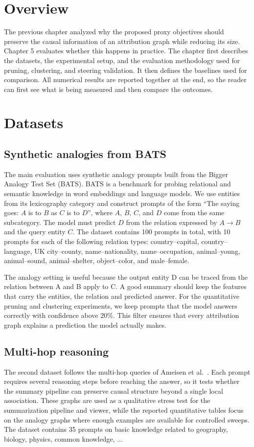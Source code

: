 \documentclass[../main.tex]{subfiles}
\begin{document}
\section{Overview}

The previous chapter analyzed why the proposed proxy objectives should preserve the causal
information of an attribution graph while reducing its size. Chapter 5 evaluates
whether this happens in practice. The chapter first describes the datasets, the
experimental setup, and the evaluation methodology used for pruning, clustering,
and steering validation. It then defines the baselines used for comparison. All
numerical results are reported together at the end, so the reader can first see
what is being measured and then compare the outcomes.

\section{Datasets}
\label{sec:datasets}

\subsection{Synthetic analogies from BATS}
The main evaluation uses synthetic analogy prompts built from the Bigger Analogy
Test Set (BATS). BATS is a benchmark for probing relational and semantic
knowledge in word embeddings and language models. We use entities from its
lexicography category and construct prompts of the form ``The saying goes: $A$
is to $B$ as $C$ is to $D$'', where $A$, $B$, $C$, and $D$ come from the same
subcategory. The model must predict $D$ from the relation expressed by
$A \to B$ and the query entity $C$. The dataset contains 100 prompts in total,
with 10 prompts for each of the following relation types: country--capital,
country--language, UK city--county, name--nationality, name--occupation,
animal--young, animal--sound, animal--shelter, object--color, and male--female.

The analogy setting is useful because the output entity D can be traced from the relation
between A and B apply to C. A good summary should keep the
features that carry the entities, the relation and predicted answer.
For the quantitative pruning and clustering experiments, we keep prompts that
the model answers correctly with confidence above $20\%$. This filter ensures
that every attribution graph explains a prediction the model actually makes.

\subsection{Multi-hop reasoning}
The second dataset follows the multi-hop queries of Ameisen et
al.~\cite{ameisen2025circuit}. Each prompt requires several reasoning steps
before reaching the answer, so it tests whether the summary pipeline can preserve
causal structure beyond a single local association. These graphs are used as a
qualitative stress test for the summarization pipeline and viewer, while the
reported quantitative tables focus on the analogy graphs where enough examples
are available for controlled sweeps. The dataset contains 35 prompts on basic knowledge
related to geography, biology, physics, common knowledge, ...
\end{document}
